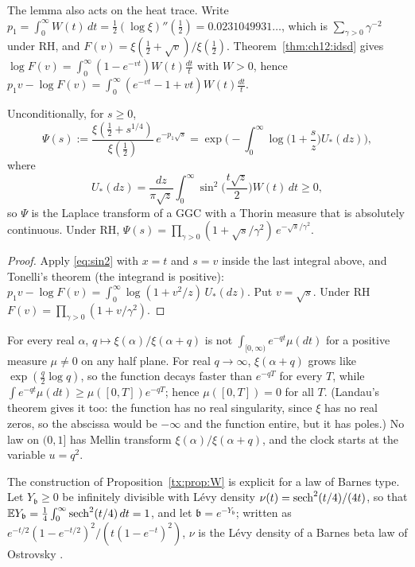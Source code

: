 The lemma also acts on the heat trace. Write $p_1=\int_0^\infty W(t)\,dt=\frac12(\log\xi)''(\frac12)=0.0231049931\ldots$, which is $\sum_{\gamma>0}\gamma^{-2}$ under RH, and $F(v)=\xi(\frac12+\sqrt v)/\xi(\frac12)$. Theorem~\ref{thm:ch12:idsd} gives $\log F(v)=\int_0^\infty(1-e^{-vt})W(t)\frac{dt}t$ with $W>0$, hence $p_1v-\log F(v)=\int_0^\infty(e^{-vt}-1+vt)W(t)\frac{dt}t$.

\begin{proposition}\label{tx:prop:W}
Unconditionally, for $s\ge0$,
\[
\Psi(s):=\frac{\xi(\frac12+s^{1/4})}{\xi(\frac12)}\,e^{-p_1\sqrt s}=\exp\Big(-\int_0^\infty\log\Big(1+\frac sz\Big)U_*(dz)\Big),
\]
where
\[
U_*(dz)=\frac{dz}{\pi\sqrt z}\int_0^\infty\sin^2\Big(\frac{t\sqrt z}2\Big)W(t)\,dt\ge0,
\]
so $\Psi$ is the Laplace transform of a GGC with a Thorin measure that is absolutely continuous. Under RH, $\Psi(s)=\prod_{\gamma>0}(1+\sqrt s/\gamma^2)\,e^{-\sqrt s/\gamma^2}$.
\end{proposition}

\begin{proof}
Apply \eqref{eq:sin2} with $x=t$ and $s=v$ inside the last integral above, and Tonelli's theorem (the integrand is positive): $p_1v-\log F(v)=\int_0^\infty\log(1+v^2/z)\,U_*(dz)$. Put $v=\sqrt s$. Under RH $F(v)=\prod_{\gamma>0}(1+v/\gamma^2)$.
\end{proof}

\begin{remark}\label{tx3:rem:forced}
For every real $\alpha$, $q\mapsto\xi(\alpha)/\xi(\alpha+q)$ is not $\int_{[0,\infty)}e^{-qt}\mu(dt)$ for a positive measure $\mu\ne0$ on any half plane. For real $q\to\infty$, $\xi(\alpha+q)$ grows like $\exp(\frac q2\log q)$, so the function decays faster than $e^{-qT}$ for every $T$, while $\int e^{-qt}\mu(dt)\ge\mu([0,T])e^{-qT}$; hence $\mu([0,T])=0$ for all $T$. (Landau's theorem \cite[Chapter~II, Theorem~5b]{Widder41} gives it too: the function has no real singularity, since $\xi$ has no real zeros, so the abscissa would be $-\infty$ and the function entire, but it has poles.) No law on $(0,1]$ has Mellin transform $\xi(\alpha)/\xi(\alpha+q)$, and the clock starts at the variable $u=q^2$.
\end{remark}

The construction of Proposition~\ref{tx:prop:W} is explicit for a law of Barnes type. Let $Y_{\mathfrak b}\ge0$ be infinitely divisible with L\'evy density $\nu(t)=\operatorname{sech}^2(t/4)/(4t)$, so that $\mathbb{E} Y_{\mathfrak b}=\frac14\int_0^\infty\operatorname{sech}^2(t/4)\,dt=1$, and let $\mathfrak b=e^{-Y_{\mathfrak b}}$; written as $e^{-t/2}(1-e^{-t/2})^2/(t(1-e^{-t})^2)$, $\nu$ is the L\'evy density of a Barnes beta law of Ostrovsky \cite{Ostrovsky13}.

